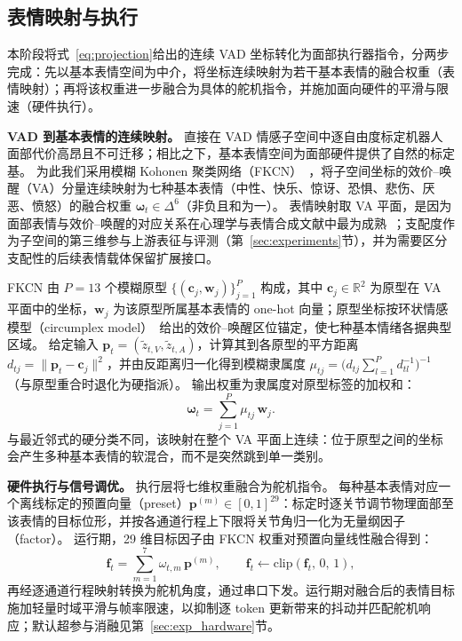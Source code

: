 \documentclass[letterpaper, 10 pt, conference]{ieeeconf/ieeeconf}
\begin{document}
\subsection{表情映射与执行}
\label{sec:actuator}

本阶段将式~\eqref{eq:projection}给出的连续 VAD 坐标转化为面部执行器指令，分两步完成：先以基本表情空间为中介，将坐标连续映射为若干基本表情的融合权重（表情映射）；再将该权重进一步融合为具体的舵机指令，并施加面向硬件的平滑与限速（硬件执行）。

\textbf{VAD 到基本表情的连续映射。}
直接在 VAD 情感子空间中逐自由度标定机器人面部代价高昂且不可迁移；相比之下，基本表情空间为面部硬件提供了自然的标定基。
为此我们采用模糊 Kohonen 聚类网络（FKCN）~\cite{han2010fkcn}，将子空间坐标的效价--唤醒（VA）分量连续映射为七种基本表情（中性、快乐、惊讶、恐惧、悲伤、厌恶、愤怒）的融合权重 $\boldsymbol{\omega}_t \in \Delta^{6}$（非负且和为一）。
表情映射取 VA 平面，是因为面部表情与效价--唤醒的对应关系在心理学与表情合成文献中最为成熟~\cite{russell1980circumplex,breazeal2002designing}；支配度作为子空间的第三维参与上游表征与评测（第~\ref{sec:experiments}节），并为需要区分支配性的后续表情载体保留扩展接口。

FKCN 由 $P = 13$ 个模糊原型 $\{(\mathbf{c}_j, \mathbf{w}_j)\}_{j=1}^{P}$ 构成，其中 $\mathbf{c}_j \in \mathbb{R}^2$ 为原型在 VA 平面中的坐标，$\mathbf{w}_j$ 为该原型所属基本表情的 one-hot 向量；原型坐标按环状情感模型（circumplex model）~\cite{russell1980circumplex}给出的效价--唤醒区位锚定，使七种基本情绪各据典型区域。
给定输入 $\mathbf{p}_t = (\tilde{z}_{t,V}, \tilde{z}_{t,A})$，计算其到各原型的平方距离 $d_{tj} = \|\mathbf{p}_t - \mathbf{c}_j\|^2$，并由反距离归一化得到模糊隶属度
$\mu_{tj} = \bigl(d_{tj}\sum_{l=1}^{P} d_{tl}^{-1}\bigr)^{-1}$（与原型重合时退化为硬指派）。
输出权重为隶属度对原型标签的加权和：
\begin{equation}
    \boldsymbol{\omega}_t = \sum_{j=1}^{P} \mu_{tj}\, \mathbf{w}_j .
    \label{eq:fkcn}
\end{equation}
与最近邻式的硬分类不同，该映射在整个 VA 平面上连续：位于原型之间的坐标会产生多种基本表情的软混合，而不是突然跳到单一类别。

\textbf{硬件执行与信号调优。}
执行层将七维权重融合为舵机指令。
每种基本表情对应一个离线标定的预置向量（preset）$\mathbf{p}^{(m)} \in [0,1]^{29}$：标定时逐关节调节物理面部至该表情的目标位形，并按各通道行程上下限将关节角归一化为无量纲因子（factor）。
运行期，29 维目标因子由 FKCN 权重对预置向量线性融合得到：
\begin{equation}
    \mathbf{f}_t = \sum_{m=1}^{7} \omega_{t,m}\, \mathbf{p}^{(m)}, \qquad \mathbf{f}_t \leftarrow \mathrm{clip}(\mathbf{f}_t,\, 0,\, 1),
    \label{eq:fusion}
\end{equation}
再经逐通道行程映射转换为舵机角度，通过串口下发。运行期对融合后的表情目标施加轻量时域平滑与帧率限速，以抑制逐 token 更新带来的抖动并匹配舵机响应；默认超参与消融见第~\ref{sec:exp_hardware}节。
\end{document}
